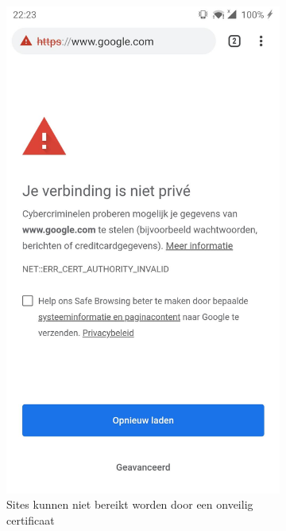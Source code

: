 \begin{figure}
    \centering
    \begin{subfigure}{.5\textwidth}
        \centering
        \includegraphics[width=0.8\linewidth]{img/charlescantconnect.jpg}
        \caption{Sites kunnen niet bereikt worden door een onveilig certificaat}
        \label{fig:charlescantconnect}
    \end{subfigure}%
    \begin{subfigure}{.5\textwidth}
        \centering

\end{subfigure}
\end{figure}
